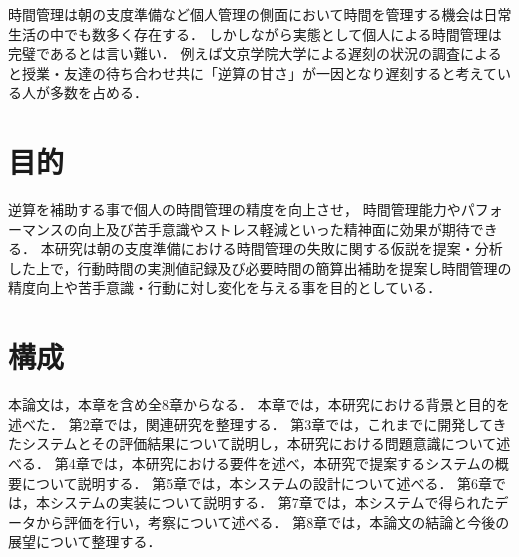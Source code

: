 時間管理は朝の支度準備など個人管理の側面において時間を管理する機会は日常生活の中でも数多く存在する．
しかしながら実態として個人による時間管理は完璧であるとは言い難い．
例えば文京学院大学による遅刻の状況の調査によると授業・友達の待ち合わせ共に「逆算の甘さ」が一因となり遅刻すると考えている人が多数を占める\cite{bunkyo}．

\section{目的}
逆算を補助する事で個人の時間管理の精度を向上させ，
時間管理能力やパフォーマンスの向上及び苦手意識やストレス軽減といった精神面に効果が期待できる．
本研究は朝の支度準備における時間管理の失敗に関する仮説を提案・分析した上で，行動時間の実測値記録及び必要時間の簡算出補助を提案し時間管理の精度向上や苦手意識・行動に対し変化を与える事を目的としている．

\section{構成}
本論文は，本章を含め全8章からなる．
本章では，本研究における背景と目的を述べた．
第2章では，関連研究を整理する．
第3章では，これまでに開発してきたシステムとその評価結果について説明し，本研究における問題意識について述べる．
第4章では，本研究における要件を述べ，本研究で提案するシステムの概要について説明する．
第5章では，本システムの設計について述べる．
第6章では，本システムの実装について説明する．
第7章では，本システムで得られたデータから評価を行い，考察について述べる．
第8章では，本論文の結論と今後の展望について整理する．